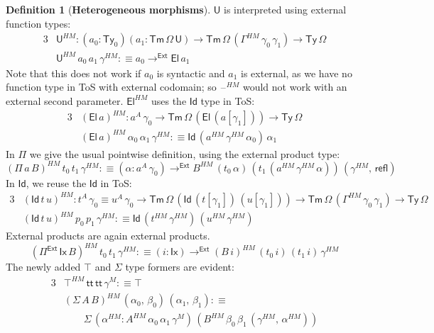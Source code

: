\documentclass[12pt,a4paper,twoside,openany]{book}
\theoremstyle{remark}
\theoremstyle{definition}
\newtheorem{mydefinition}{Definition}
\theoremstyle{theorem}
\newcommand{\ms}[1]{\mathsf{#1}}
\newcommand{\refl}{\mathsf{refl}}
\newcommand{\Tm}{\mathsf{Tm}}
\newcommand{\Ty}{\mathsf{Ty}}
\newcommand{\U}{\mathsf{U}}
\newcommand{\El}{\mathsf{El}}
\newcommand{\Id}{\mathsf{Id}}
\renewcommand{\tt}{\mathsf{tt}}
\newcommand{\blank}{\mathord{\hspace{1pt}\text{--}\hspace{1pt}}}
\newcommand{\Pie}{\Pi^{\mathsf{Ext}}}
\newcommand{\toe}{\to^{\ms{Ext}}}
\newcommand{\defn}{:\equiv}
\begin{document}
\begin{mydefinition}[\textbf{Heterogeneous morphisms}]
\noindent $\U$ is interpreted using external function types:
\begin{alignat*}{3}
  & \U^{HM} : (a_0 : \Ty_0)(a_1 : \Tm\,\Omega\,\U) \to \Tm\,\Omega\,(\Gamma^{HM}\,\gamma_0\,\gamma_1)
  \to \Ty\,\Omega\\
  & \U^{HM}\,a_0\,a_1\,\gamma^{HM} \defn a_0 \toe \El\,a_1
\end{alignat*}
Note that this does not work if $a_0$ is syntactic and $a_1$ is external, as we
have no function type in ToS with external codomain; so $\blank^{HM}$ would not
work with an external second parameter. $\El^{HM}$ uses the $\Id$ type in ToS:
\begin{alignat*}{3}
  & (\El\,a)^{HM} : a^A\,\gamma_0 \to \Tm\,\Omega\,(\El\,(a[\gamma_1])) \to \Ty\,\Omega\\
  & (\El\,a)^{HM}\,\alpha_0\,\alpha_1\,\gamma^{HM} \defn \Id\,(a^{HM}\,\gamma^{HM}\,\alpha_0)\,\alpha_1
\end{alignat*}
In $\Pi$ we give the usual pointwise definition, using the external product type:
\[
  (\Pi\,a\,B)^{HM}\,t_0\,t_1\,\gamma^{HM} \defn (\alpha : a^A\,\gamma_0) \toe B^{HM}\,(t_0\,\alpha)\,(t_1\,(a^{HM}\,\gamma^{HM}\,\alpha))\,(\gamma^{HM},\,\refl)
\]
In $\Id$, we reuse the $\Id$ in ToS:
\begin{alignat*}{3}
  &(\Id\,t\,u)^{HM} : t^A\,\gamma_0 \equiv u^A\,\gamma_0 \to \Tm\,\Omega\,(\Id\,(t[\gamma_1])\,(u[\gamma_1]))
   \to \Tm\,\Omega\,(\Gamma^{HM}\,\gamma_0\,\gamma_1) \to \Ty\,\Omega\\
  &(\Id\,t\,u)^{HM}\,p_0\,p_1\,\gamma^{HM} \defn  \Id\,(t^{HM}\,\gamma^{HM})\,(u^{HM}\,\gamma^{HM})
\end{alignat*}
External products are again external products.
\[
  (\Pie\,\ms{Ix}\,B)^{HM}\,t_0\,t_1\,\gamma^{HM} \defn (i : \ms{Ix}) \toe (B\,i)^{HM}\,(t_0\,i)\,(t_1\,i)\,\gamma^{HM}
\]
The newly added $\top$ and $\Sigma$ type formers are evident:
\begin{alignat*}{3}
  &\top^{HM}\,\tt\,\tt\,\gamma^M \defn \top\\
  &(\Sigma\,A\,B)^{HM}\,(\alpha_0,\,\beta_0)\,(\alpha_1,\,\beta_1) \defn\\
  &\hspace{2em}\Sigma\,(\alpha^{HM} : A^{HM}\,\alpha_0\,\alpha_1\,\gamma^M)\,
          (B^{HM}\,\beta_0\,\beta_1\,(\gamma^{HM},\,\alpha^{HM}))
\end{alignat*}
\end{mydefinition}
\end{document}
